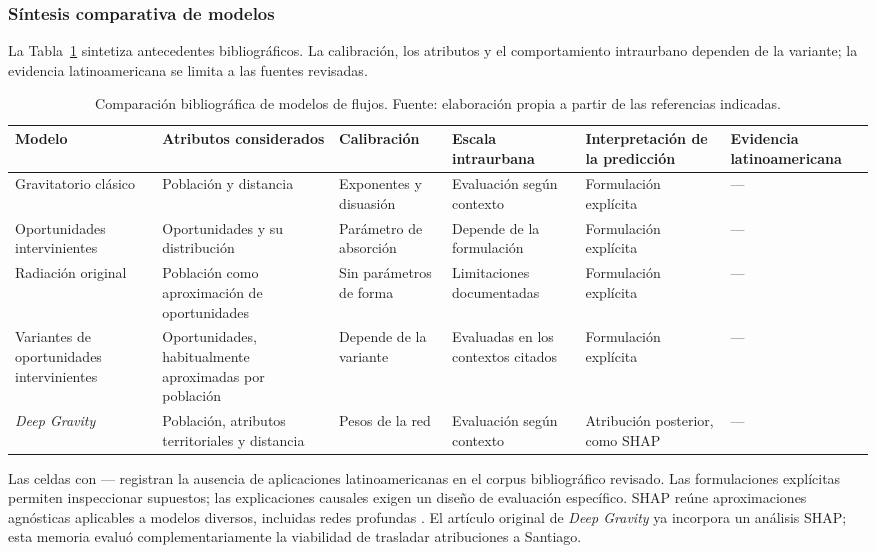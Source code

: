 \subsubsection{Síntesis comparativa de modelos}

La Tabla~\ref{tab:comparacion_modelos} sintetiza antecedentes bibliográficos. La calibración, los atributos y el comportamiento intraurbano dependen de la variante; la evidencia latinoamericana se limita a las fuentes revisadas.

\begin{table}[H]
\centering
\caption{Comparación bibliográfica de modelos de flujos. Fuente: elaboración propia a partir de las referencias indicadas.}
\label{tab:comparacion_modelos}
\footnotesize
\renewcommand{\arraystretch}{1.15}
\begin{tabularx}{\textwidth}{@{}p{2.4cm}XXXXX@{}}
\toprule
\textbf{Modelo} &
\textbf{Atributos considerados} &
\textbf{Calibración} &
\textbf{Escala intraurbana} &
\textbf{Interpretación de la predicción} &
\textbf{Evidencia latinoamericana} \\
\midrule
Gravitatorio clásico \cite{zipf1946p,liu2024interdisciplinary}
    & Población y distancia
    & Exponentes y disuasión
    & Evaluación según contexto
    & Formulación explícita
    & --- \\
Oportunidades intervinientes \cite{stouffer1940intervening,liu2020intervening}
    & Oportunidades y su distribución
    & Parámetro de absorción
    & Depende de la formulación
    & Formulación explícita
    & --- \\
Radiación original \cite{simini2012universal,yan2014population}
    & Población como aproximación de oportunidades
    & Sin parámetros de forma
    & Limitaciones documentadas
    & Formulación explícita
    & --- \\
Variantes de oportunidades intervinientes \cite{yan2014population,liu2019opportunity}
    & Oportunidades, habitualmente aproximadas por población
    & Depende de la variante
    & Evaluadas en los contextos citados
    & Formulación explícita
    & --- \\
\textit{Deep Gravity} \cite{simini2021deep}
    & Población, atributos territoriales y distancia
    & Pesos de la red
    & Evaluación según contexto
    & Atribución posterior, como SHAP
    & --- \\
\bottomrule
\end{tabularx}

\smallskip
\begin{minipage}{\textwidth}
\footnotesize
Las celdas con --- registran la ausencia de aplicaciones latinoamericanas en el corpus bibliográfico revisado. Las formulaciones explícitas permiten inspeccionar supuestos; las explicaciones causales exigen un diseño de evaluación específico. SHAP reúne aproximaciones agnósticas aplicables a modelos diversos, incluidas redes profundas \cite{lundberg2017shap}. El artículo original de \textit{Deep Gravity} ya incorpora un análisis SHAP; esta memoria evaluó complementariamente la viabilidad de trasladar atribuciones a Santiago.
\end{minipage}
\end{table}

